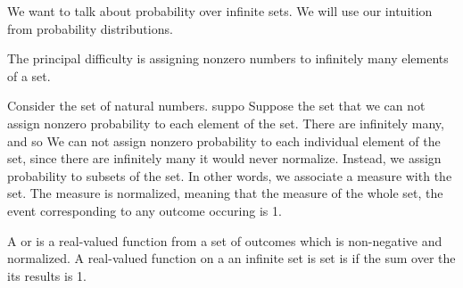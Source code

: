 
\sbasic































\sstart
{}


We want to talk about
probability over
infinite sets.
We will use our intuition from
probability distributions.


The principal difficulty is
assigning nonzero numbers to
infinitely many elements of
a set.

Consider the set of natural
numbers. suppo
Suppose the set
that we can not assign nonzero
probability to each element of
the set. There are infinitely
many, and so
We can not assign nonzero
probability to each individual
element of the set, since there
are infinitely many it would
never normalize.
Instead, we assign probability
to subsets of the set.
In other words, we associate
a measure with the set.
The measure is normalized, meaning
that the measure of the whole set,
the event corresponding
to any outcome occuring is 1.


A  or
is a real-valued function
from a set of outcomes which is
non-negative and normalized.
A real-valued function on a
an infinite set is  set
is  if the sum over the
its results is 1.
\strats
